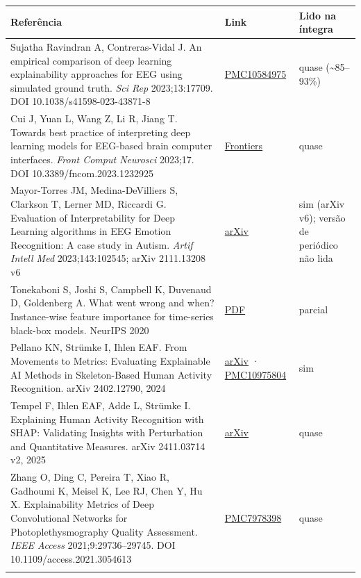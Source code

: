 \documentclass[11pt,a4paper]{article}
\begin{document}
{\scriptsize\setlength{\tabcolsep}{3pt}
\begin{xltabular}{\linewidth}{>{\raggedright\arraybackslash}X>{\raggedright\arraybackslash}X>{\raggedright\arraybackslash}X}
\toprule
\textbf{Referência} & \textbf{Link} & \textbf{Lido na íntegra} \\
\midrule
\endhead
Sujatha Ravindran A, Contreras-Vidal J. An empirical comparison of deep learning explainability approaches for EEG using simulated ground truth. \textit{Sci Rep} 2023;13:17709. DOI 10.1038/s41598-023-43871-8 & \href{https://pmc.ncbi.nlm.nih.gov/articles/PMC10584975/}{PMC10584975} & quase (\textasciitilde{}85–93\%) \\ \addlinespace[1pt]
Cui J, Yuan L, Wang Z, Li R, Jiang T. Towards best practice of interpreting deep learning models for EEG-based brain computer interfaces. \textit{Front Comput Neurosci} 2023;17. DOI 10.3389/fncom.2023.1232925 & \href{https://www.frontiersin.org/journals/computational-neuroscience/articles/10.3389/fncom.2023.1232925/full}{Frontiers} & quase \\ \addlinespace[1pt]
Mayor-Torres JM, Medina-DeVilliers S, Clarkson T, Lerner MD, Riccardi G. Evaluation of Interpretability for Deep Learning algorithms in EEG Emotion Recognition: A case study in Autism. \textit{Artif Intell Med} 2023;143:102545; arXiv 2111.13208 v6 & \href{https://arxiv.org/abs/2111.13208v6}{arXiv} & sim (arXiv v6); versão de periódico não lida \\ \addlinespace[1pt]
Tonekaboni S, Joshi S, Campbell K, Duvenaud D, Goldenberg A. What went wrong and when? Instance-wise feature importance for time-series black-box models. NeurIPS 2020 & \href{https://proceedings.nips.cc/paper_files/paper/2020/file/08fa43588c2571ade19bc0fa5936e028-Paper.pdf}{PDF} & parcial \\ \addlinespace[1pt]
Pellano KN, Strümke I, Ihlen EAF. From Movements to Metrics: Evaluating Explainable AI Methods in Skeleton-Based Human Activity Recognition. arXiv 2402.12790, 2024 & \href{https://arxiv.org/pdf/2402.12790}{arXiv} · \href{https://www.ncbi.nlm.nih.gov/pmc/articles/PMC10975804/}{PMC10975804} & sim \\ \addlinespace[1pt]
Tempel F, Ihlen EAF, Adde L, Strümke I. Explaining Human Activity Recognition with SHAP: Validating Insights with Perturbation and Quantitative Measures. arXiv 2411.03714 v2, 2025 & \href{https://arxiv.org/html/2411.03714}{arXiv} & quase \\ \addlinespace[1pt]
Zhang O, Ding C, Pereira T, Xiao R, Gadhoumi K, Meisel K, Lee RJ, Chen Y, Hu X. Explainability Metrics of Deep Convolutional Networks for Photoplethysmography Quality Assessment. \textit{IEEE Access} 2021;9:29736–29745. DOI 10.1109/access.2021.3054613 & \href{https://pmc.ncbi.nlm.nih.gov/articles/PMC7978398/}{PMC7978398} & quase \\ \addlinespace[1pt]

\end{xltabular}}
\end{document}

